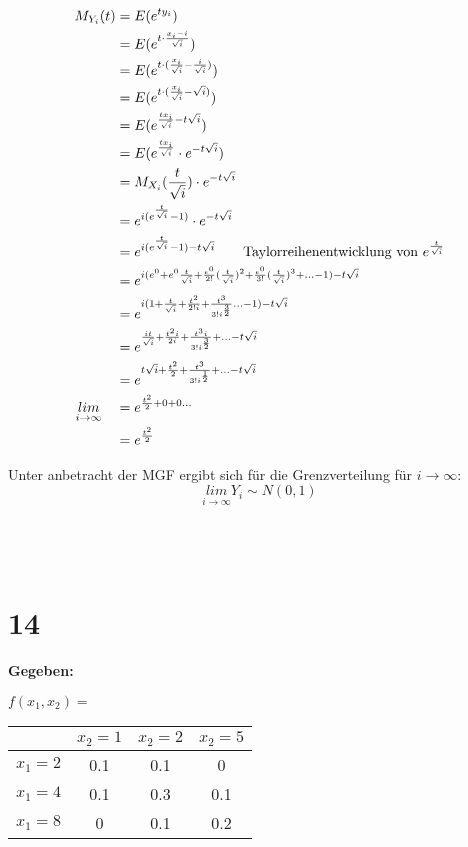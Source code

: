 \documentclass{article}
\begin{document}
\begin{align*}
    M_{Y_i}(t) &= E(e^{ty_i})\\
    &= E(e^{t \cdot \frac{x_i - i}{\sqrt{i}}})\\
    &= E(e^{t \cdot (\frac{x_i}{\sqrt{i}}- \frac{i}{\sqrt{i}})}) \\
    &= E(e^{t \cdot (\frac{x_i}{\sqrt{i}}- \sqrt{i})}) \\
    &= E(e^{\frac{tx_i}{\sqrt{i}}- t\sqrt{i}} ) \\
    &= E(e^{\frac{tx_i}{\sqrt{i}}} \cdot e^{- t\sqrt{i}}) \\
    &= M_{X_i}(\frac{t}{\sqrt{i}}) \cdot e^{-t\sqrt{i}} \\
    &= e^{i(e^{\frac{t}{\sqrt{i}}}-1)} \cdot e^{-t\sqrt{i}} \\
    &= e^{i(e^{\frac{t}{\sqrt{i}}}-1)-t\sqrt{i}} \tag*{Taylorreihenentwicklung von $e^{\frac{t}{\sqrt{i}}}$}\\
    &= e^{i(e^0 + e^0\frac{t}{\sqrt{i}}+ \frac{e^0}{2!} (\frac{t}{\sqrt{i}})^2 + \frac{e^0}{3!} (\frac{t}{\sqrt{i}})^3+ \ldots - 1) - t\sqrt{i}}  \\
    &= e^{i(1 + \frac{t}{\sqrt{i}} + \frac{t^2}{2! i} + \frac{t^3}{3! i^{\frac{3}{2}}} \ldots - 1) -t\sqrt{i}} \\
    &= e^{\frac{i t}{\sqrt{i}} + \frac{t^2i}{2i} + \frac{t^3i}{3!i^{\frac{3}{2}}} + \ldots - t\sqrt{i}} \\
    &= e^{t\sqrt{i} + \frac{t^2}{2} + \frac{t^3}{3!i^{\frac{1}{2}}} + \ldots - t\sqrt{i}} \\
    \underset{i \rightarrow \infty}{lim} \quad &= e^{\frac{t^2}{2} + 0 + 0 \ldots } \\
    &= e^{\frac{t^2}{2}} 
\end{align*}

Unter anbetracht der MGF ergibt sich für die Grenzverteilung für $i \rightarrow \infty$:
\[\underset{i \rightarrow \infty}{lim} Y_i \sim N(0, 1)\]
\\ \\ \\
\section*{14} 
\textbf{Gegeben:} \\

\begin{table}[h]
    \centering
    $f(x_1, x_2)= $
    \begin{tabular}{|c|c|c|c|}
    \hline
    & $x_2 = 1 $ & $x_2 = 2$ & $x_2 = 5$ \\ \hline
    $x_1 = 2$ & 0.1 & 0.1 & 0\\ \hline
    $x_1 = 4$ & 0.1 & 0.3 & 0.1 \\ \hline
    $x_1 = 8$ & 0 & 0.1 & 0.2 \\ \hline
    \end{tabular}
\end{table}
\end{document}
